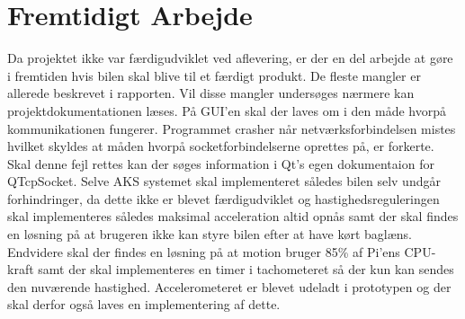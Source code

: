 \chapter{Fremtidigt Arbejde} \label{ch:Fremtidigt_arbejde}

Da projektet ikke var færdigudviklet ved aflevering, er der en del arbejde at gøre i fremtiden hvis bilen skal blive til et færdigt produkt. De fleste mangler er allerede beskrevet i rapporten. Vil disse mangler undersøges nærmere kan projektdokumentationen læses. På GUI'en skal der laves om i den måde hvorpå kommunikationen fungerer. Programmet crasher når netværksforbindelsen mistes hvilket skyldes at måden hvorpå socketforbindelserne oprettes på, er forkerte. Skal denne fejl rettes kan der søges information i Qt's egen dokumentaion for QTcpSocket\cite{lib:qtcpsocket}. Selve AKS systemet skal implementeret således bilen selv undgår forhindringer, da dette ikke er blevet færdigudviklet og hastighedsreguleringen skal implementeres således maksimal acceleration altid opnås samt der skal findes en løsning på at brugeren ikke kan styre bilen efter at have kørt baglæns. Endvidere skal der findes en løsning på at motion bruger 85\% af Pi'ens CPU-kraft samt der skal implementeres en timer i tachometeret så der kun kan sendes den nuværende hastighed. Accelerometeret er blevet udeladt i prototypen og der skal derfor også laves en implementering af dette.
